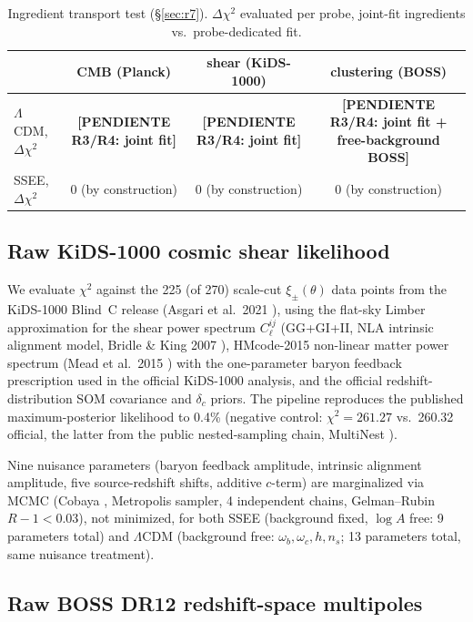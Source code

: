 \documentclass[12pt,a4paper]{article}
\newcommand{\SSEE}{\textsc{SSEE}}
\newcommand{\TODO}[1]{\textcolor{red!70!black}{\textbf{[PENDIENTE R3/R4: #1]}}}
\begin{document}
\begin{table}[h]
\centering
\caption{Ingredient transport test (\S\ref{sec:r7}). $\Delta\chi^2$ evaluated
per probe, joint-fit ingredients vs.\ probe-dedicated fit.}
\label{tab:r7}
\begin{tabular}{lccc}
\toprule
 & CMB (Planck) & shear (KiDS-1000) & clustering (BOSS) \\
\midrule
$\Lambda$CDM, $\Delta\chi^2$ & \TODO{joint fit} & \TODO{joint fit} & \TODO{joint fit + free-background BOSS} \\
\SSEE{}, $\Delta\chi^2$ & 0 (by construction) & 0 (by construction) & 0 (by construction) \\
\bottomrule
\end{tabular}
\end{table}

\subsection{Raw KiDS-1000 cosmic shear likelihood}
\label{sec:kids-method}

We evaluate $\chi^2$ against the 225 (of 270) scale-cut $\xi_\pm(\theta)$ data
points from the KiDS-1000 Blind~C release (Asgari et al.~2021 \citep{Asgari2021}), using the flat-sky
Limber approximation for the shear power spectrum $C_\ell^{ij}$ (GG+GI+II, NLA
intrinsic alignment model, Bridle \& King 2007 \citep{BridleKing2007}), HMcode-2015 non-linear
matter power spectrum (Mead et al.~2015 \citep{Mead2015}) with the one-parameter baryon
feedback prescription used in the official KiDS-1000 analysis, and the
official redshift-distribution SOM covariance and $\delta_c$ priors. The
pipeline reproduces the published maximum-posterior likelihood to 0.4\%
(negative control: $\chi^2=261.27$ vs.\ 260.32 official, the latter from the
public nested-sampling chain, MultiNest \citep{Feroz2009}).

Nine nuisance parameters (baryon feedback amplitude, intrinsic alignment
amplitude, five source-redshift shifts, additive $c$-term) are marginalized
via MCMC (Cobaya \citep{Cobaya}, Metropolis sampler, 4 independent chains,
Gelman--Rubin $R-1<0.03$), not minimized, for both \SSEE{} (background fixed,
$\log A$ free: 9 parameters total) and $\Lambda$CDM (background free:
$\omega_b,\omega_c,h,n_s$; 13 parameters total, same nuisance treatment).

\subsection{Raw BOSS DR12 redshift-space multipoles}
\label{sec:boss-method}
\end{document}

